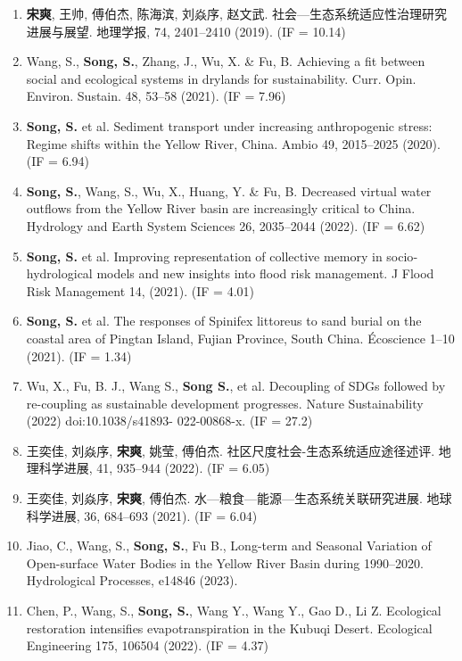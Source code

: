 
\begin{paper}
\begin{enumerate}
	\item \textbf{宋爽}, 王帅, 傅伯杰, 陈海滨, 刘焱序, 赵文武. 社会—生态系统适应性治理研究进展与展望. 地理学报, 74, 2401–2410 (2019). (IF = 10.14) 
	\item Wang, S., \textbf{Song, S.}, Zhang, J., Wu, X. \& Fu, B. Achieving a fit between social and ecological systems in drylands for sustainability. Curr. Opin. Environ. Sustain. 48, 53–58 (2021). (IF = 7.96) 
	\item \textbf{Song, S.} et al. Sediment transport under increasing anthropogenic stress: Regime shifts within the Yellow River, China. Ambio 49, 2015–2025 (2020). (IF = 6.94) 
	\item \textbf{Song, S.}, Wang, S., Wu, X., Huang, Y. \& Fu, B. Decreased virtual water outflows from the Yellow River basin are increasingly critical to China. Hydrology and Earth System Sciences 26, 2035–2044 (2022). (IF = 6.62) 
	\item \textbf{Song, S.} et al. Improving representation of collective memory in socio‐hydrological models and new insights into flood risk management. J Flood Risk Management 14, (2021). (IF = 4.01) 
	\item \textbf{Song, S.} et al. The responses of Spinifex littoreus to sand burial on the coastal area of Pingtan Island, Fujian Province, South China. Écoscience 1–10 (2021). (IF = 1.34) 
	\item Wu, X., Fu, B. J., Wang S., \textbf{Song S.}, et al. Decoupling of SDGs followed by re-coupling as sustainable development progresses. Nature Sustainability (2022) doi:10.1038/s41893- 022-00868-x. (IF = 27.2)
	\item 王奕佳, 刘焱序, \textbf{宋爽}, 姚莹, 傅伯杰. 社区尺度社会-生态系统适应途径述评. 地理科学进展, 41, 935–944 (2022). (IF = 6.05) 
	\item 王奕佳, 刘焱序, \textbf{宋爽}, 傅伯杰. 水—粮食—能源—生态系统关联研究进展. 地球科学进展, 36, 684–693 (2021). (IF = 6.04) 
	\item Jiao, C., Wang, S., \textbf{Song, S.}, Fu B., Long-term and Seasonal Variation of Open-surface Water Bodies in the Yellow River Basin during 1990–2020. Hydrological Processes, e14846 (2023).
	\item Chen, P., Wang, S., \textbf{Song, S.}, Wang Y., Wang Y., Gao D., Li Z. Ecological restoration intensifies evapotranspiration in the Kubuqi Desert. Ecological Engineering 175, 106504 (2022). (IF = 4.37) 

\end{enumerate}
\end{paper}
